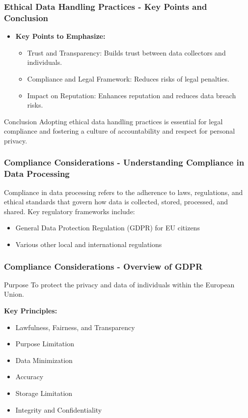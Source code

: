 \documentclass[aspectratio=169]{beamer}
\begin{document}
\begin{frame}[fragile]
  \frametitle{Ethical Data Handling Practices - Key Points and Conclusion}
  
  \begin{itemize}
    \item \textbf{Key Points to Emphasize:}
      \begin{itemize}
        \item Trust and Transparency: Builds trust between data collectors and individuals.
        \item Compliance and Legal Framework: Reduces risks of legal penalties.
        \item Impact on Reputation: Enhances reputation and reduces data breach risks.
      \end{itemize}
  \end{itemize}
  
  \begin{block}{Conclusion}
    Adopting ethical data handling practices is essential for legal compliance and fostering a culture of accountability and respect for personal privacy.
  \end{block}
\end{frame}

\begin{frame}[fragile]
    \frametitle{Compliance Considerations - Understanding Compliance in Data Processing}
    Compliance in data processing refers to the adherence to laws, regulations, and ethical standards that govern how data is collected, stored, processed, and shared. Key regulatory frameworks include:
    \begin{itemize}
        \item General Data Protection Regulation (GDPR) for EU citizens
        \item Various other local and international regulations
    \end{itemize}
\end{frame}

\begin{frame}[fragile]
    \frametitle{Compliance Considerations - Overview of GDPR}
    \begin{block}{Purpose}
        To protect the privacy and data of individuals within the European Union.
    \end{block}
    \vspace{5pt}
    \textbf{Key Principles:}
    \begin{itemize}
        \item Lawfulness, Fairness, and Transparency
        \item Purpose Limitation
        \item Data Minimization
        \item Accuracy
        \item Storage Limitation
        \item Integrity and Confidentiality
    \end{itemize}
\end{frame}
\end{document}
